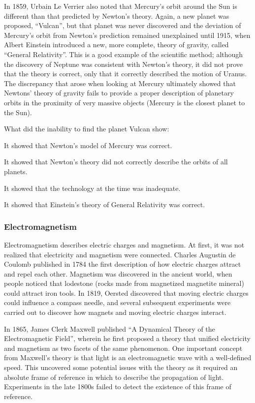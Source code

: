 In 1859, Urbain Le Verrier also noted that Mercury's orbit around the Sun is different than that predicted by Newton's theory. Again, a new planet was proposed, ``Vulcan'', but that planet was never discovered and the deviation of Mercury's orbit from Newton's prediction remained unexplained until 1915, when Albert Einstein introduced a new, more complete, theory of gravity, called ``General Relativity''. This is a good example of the scientific method; although the discovery of Neptune was consistent with Newton's theory, it did not prove that the theory is correct, only that it correctly described the motion of Uranus. The discrepancy that arose when looking at Mercury ultimately showed that Newtons' theory of gravity fails to provide a proper description of planetary orbits in the proximity of very massive objects (Mercury is the closest planet to the Sun). 

\begin{checkpoint}
\begin{MCquestion}{What did the inability to find the planet Vulcan show:}
\item It showed that Newton's model of Mercury was correct. 
\item It showed that Newton's theory did not correctly describe the orbits of all planets.\correct
\item It showed that the technology at the time was inadequate. 
\item It showed that Einstein's theory of General Relativity was correct. 
\end{MCquestion}
\end{checkpoint}
 

\subsubsection{Electromagnetism}
Electromagnetism describes electric charges and magnetism. At first, it was not realized that electricity and magnetism were connected. Charles Augustin de Coulomb published in 1784 the first description of how electric charges attract and repel each other. Magnetism was discovered in the ancient world, when people noticed that lodestone (rocks made from magnetized magnetite mineral) could attract iron tools. In 1819, Oersted discovered that moving electric charges could influence a compass needle, and several subsequent experiments were carried out to discover how magnets and moving electric charges interact.

In 1865, James Clerk Maxwell published ``A Dynamical Theory of the Electromagnetic Field'', wherein he first proposed a theory that unified electricity and magnetism as two facets of the same phenomenon. One important concept from Maxwell's theory is that light is an electromagnetic wave with a well-defined speed. This uncovered some potential issues with the theory as it required an absolute frame of reference in which to describe the propagation of light. Experiments in the late 1800s failed to detect the existence of this frame of reference.

